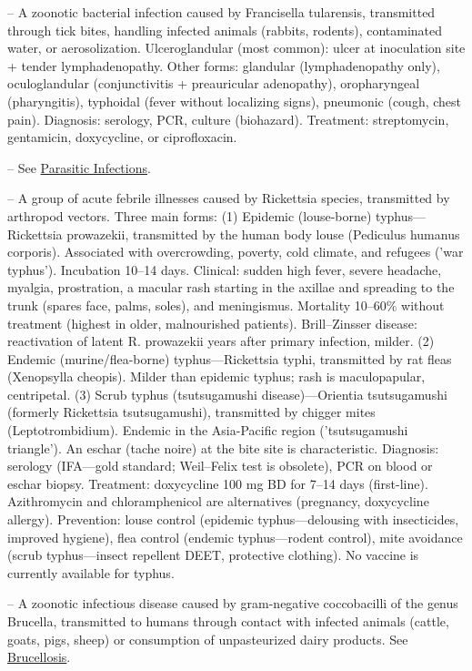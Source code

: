 -- A zoonotic bacterial infection caused by Francisella tularensis, transmitted through tick bites, handling infected animals (rabbits, rodents), contaminated water, or aerosolization. Ulceroglandular (most common): ulcer at inoculation site + tender lymphadenopathy. Other forms: glandular (lymphadenopathy only), oculoglandular (conjunctivitis + preauricular adenopathy), oropharyngeal (pharyngitis), typhoidal (fever without localizing signs), pneumonic (cough, chest pain). Diagnosis: serology, PCR, culture (biohazard). Treatment: streptomycin, gentamicin, doxycycline, or ciprofloxacin.

-- See \hyperlink{Parasitic Infections}{Parasitic Infections}.

-- A group of acute febrile illnesses caused by Rickettsia species, transmitted by arthropod vectors. Three main forms: (1) Epidemic (louse-borne) typhus—Rickettsia prowazekii, transmitted by the human body louse (Pediculus humanus corporis). Associated with overcrowding, poverty, cold climate, and refugees ('war typhus'). Incubation 10--14 days. Clinical: sudden high fever, severe headache, myalgia, prostration, a macular rash starting in the axillae and spreading to the trunk (spares face, palms, soles), and meningismus. Mortality 10--60\% without treatment (highest in older, malnourished patients). Brill–Zinsser disease: reactivation of latent R. prowazekii years after primary infection, milder. (2) Endemic (murine/flea-borne) typhus—Rickettsia typhi, transmitted by rat fleas (Xenopsylla cheopis). Milder than epidemic typhus; rash is maculopapular, centripetal. (3) Scrub typhus (tsutsugamushi disease)—Orientia tsutsugamushi (formerly Rickettsia tsutsugamushi), transmitted by chigger mites (Leptotrombidium). Endemic in the Asia-Pacific region ('tsutsugamushi triangle'). An eschar (tache noire) at the bite site is characteristic. Diagnosis: serology (IFA—gold standard; Weil–Felix test is obsolete), PCR on blood or eschar biopsy. Treatment: doxycycline 100 mg BD for 7--14 days (first-line). Azithromycin and chloramphenicol are alternatives (pregnancy, doxycycline allergy). Prevention: louse control (epidemic typhus—delousing with insecticides, improved hygiene), flea control (endemic typhus—rodent control), mite avoidance (scrub typhus—insect repellent DEET, protective clothing). No vaccine is currently available for typhus.

-- A zoonotic infectious disease caused by gram-negative coccobacilli of the genus Brucella, transmitted to humans through contact with infected animals (cattle, goats, pigs, sheep) or consumption of unpasteurized dairy products. See \hyperlink{Brucellosis}{Brucellosis}.

